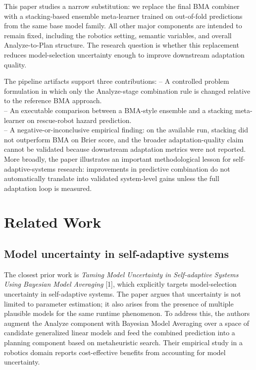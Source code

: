 \documentclass[11pt,a4paper]{article}
\begin{document}
This paper studies a narrow substitution: we replace the final BMA combiner with a stacking-based ensemble meta-learner trained on out-of-fold predictions from the same base model family. All other major components are intended to remain fixed, including the robotics setting, semantic variables, and overall Analyze-to-Plan structure. The research question is whether this replacement reduces model-selection uncertainty enough to improve downstream adaptation quality.

The pipeline artifacts support three contributions:
\noindent -- A controlled problem formulation in which only the Analyze-stage combination rule is changed relative to the reference BMA approach.\\
\noindent -- An executable comparison between a BMA-style ensemble and a stacking meta-learner on rescue-robot hazard prediction.\\
\noindent -- A negative-or-inconclusive empirical finding: on the available run, stacking did not outperform BMA on Brier score, and the broader adaptation-quality claim cannot be validated because downstream adaptation metrics were not reported.\\

More broadly, the paper illustrates an important methodological lesson for self-adaptive-systems research: improvements in predictive combination do not automatically translate into validated system-level gains unless the full adaptation loop is measured.


\section{Related Work}

\subsection{Model uncertainty in self-adaptive systems}
The closest prior work is \textit{Taming Model Uncertainty in Self-adaptive Systems Using Bayesian Model Averaging} [1], which explicitly targets model-selection uncertainty in self-adaptive systems. The paper argues that uncertainty is not limited to parameter estimation; it also arises from the presence of multiple plausible models for the same runtime phenomenon. To address this, the authors augment the Analyze component with Bayesian Model Averaging over a space of candidate generalized linear models and feed the combined prediction into a planning component based on metaheuristic search. Their empirical study in a robotics domain reports cost-effective benefits from accounting for model uncertainty.
\end{document}
